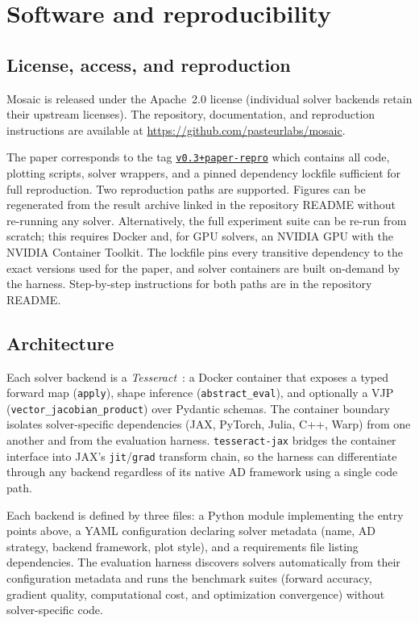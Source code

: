 \section{Software and reproducibility}
\label{app:software}

\subsection{License, access, and reproduction}

Mosaic is released under the Apache~2.0 license (individual solver backends
retain their upstream licenses). The repository, documentation, and
reproduction instructions are available at
\url{https://github.com/pasteurlabs/mosaic}.

The paper corresponds to the tag
\href{https://github.com/pasteurlabs/mosaic/tree/v0.3%2Bpaper-repro}{\texttt{v0.3+paper-repro}}
which contains all code, plotting scripts,
solver wrappers, and a pinned dependency lockfile sufficient for full
reproduction. Two reproduction paths are supported. Figures can be
regenerated from the result archive linked in the repository README without
re-running any solver. Alternatively, the full experiment suite can be
re-run from scratch; this requires Docker and, for GPU solvers, an NVIDIA
GPU with the NVIDIA Container Toolkit. The lockfile pins every transitive
dependency to the exact versions used for the paper, and solver containers
are built on-demand by the harness. Step-by-step instructions for both
paths are in the repository README.

\subsection{Architecture}

Each solver backend is a \emph{Tesseract}~\cite{haefner2025tesseract}: a
Docker container that exposes a typed forward map (\texttt{apply}), shape
inference (\texttt{abstract\_eval}), and optionally a VJP
(\texttt{vector\_jacobian\_product}) over Pydantic schemas. The container
boundary isolates solver-specific dependencies (JAX, PyTorch, Julia, C++,
Warp) from one another and from the evaluation harness.
\texttt{tesseract-jax} bridges the container interface into JAX's
\texttt{jit}/\texttt{grad} transform chain, so the harness can
differentiate through any backend regardless of its native AD framework
using a single code path.

Each backend is defined by three files: a Python module implementing the
entry points above, a YAML configuration declaring solver metadata (name,
AD strategy, backend framework, plot style), and a requirements file listing
dependencies. The evaluation harness discovers solvers automatically from
their configuration metadata and runs the benchmark suites (forward
accuracy, gradient quality, computational cost, and optimization
convergence) without solver-specific code.

